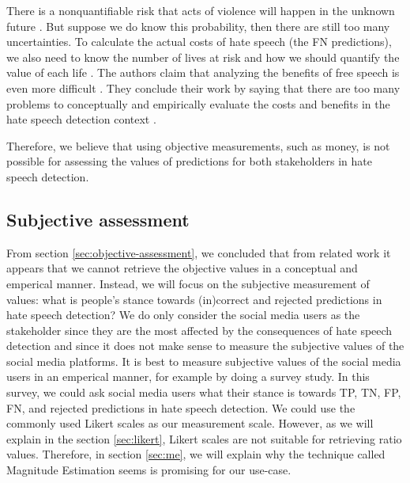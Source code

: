 %
There is a nonquantifiable risk that acts of violence will happen in the unknown future \citep{sunstein2018does}.
%
But suppose we do know this probability, then there are still too many uncertainties.
%
To calculate the actual costs of hate speech (the FN predictions), we also need to know the number of lives at risk and how we should quantify the value of each life \citep{sunstein2018does}.
%
The authors claim that analyzing the benefits of free speech is even more difficult \citep{sunstein2018does}.
%
They conclude their work by saying that there are too many problems to conceptually and empirically evaluate the costs and benefits in the hate speech detection context \citep{sunstein2018does}.
%

%
Therefore, we believe that using objective measurements, such as money, is not possible for assessing the values of predictions for both stakeholders in hate speech detection.
%

\subsection{Subjective assessment}
From section \ref{sec:objective-assessment}, we concluded that from related work it appears that we cannot retrieve the objective values in a conceptual and emperical manner.
%
Instead, we will focus on the subjective measurement of values: what is people's stance towards (in)correct and rejected predictions in hate speech detection?
%
We do only consider the social media users as the stakeholder since they are the most affected by the consequences of hate speech detection and since it does not make sense to measure the subjective values of the social media platforms.
%
It is best to measure subjective values of the social media users in an emperical manner, for example by doing a survey study.
%
In this survey, we could ask social media users what their stance is towards TP, TN, FP, FN, and rejected predictions in hate speech detection.
%
We could use the commonly used Likert scales as our measurement scale.
%
However, as we will explain in the section \ref{sec:likert}, Likert scales are not suitable for retrieving ratio values.
%
Therefore, in section \ref{sec:me}, we will explain why the technique called Magnitude Estimation seems is promising for our use-case.

